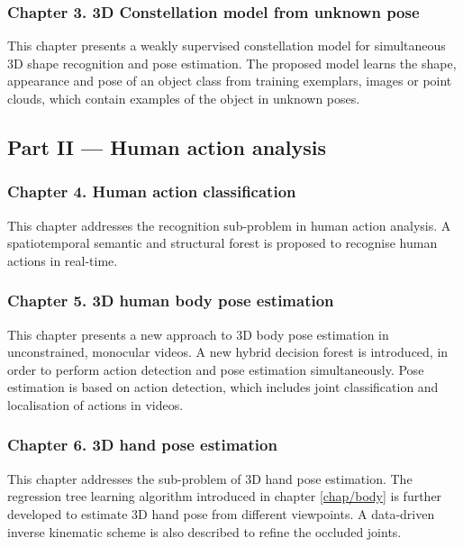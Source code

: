 \subsubsection*{Chapter 3. 3D Constellation model from unknown pose}
This chapter presents a weakly supervised constellation model for simultaneous 3D shape recognition and pose estimation. 
The proposed model learns the shape, appearance and pose of an object class from training exemplars, \eg images or point clouds, which contain examples of the object in unknown poses.  

\subsection*{Part II --- Human action analysis}


\subsubsection*{Chapter 4. Human action classification} 
This chapter addresses the recognition sub-problem in human action analysis. A spatiotemporal semantic and structural forest is proposed to recognise human actions in real-time.    

\subsubsection*{Chapter 5. 3D human body pose estimation} 
This chapter presents a new approach to 3D body pose estimation in unconstrained, monocular videos. 
A new hybrid decision forest is introduced, in order to perform action detection and pose estimation simultaneously. 
Pose estimation is based on action detection, which includes joint classification and localisation of actions in videos. 

\subsubsection*{Chapter 6. 3D hand pose estimation} 
This chapter addresses the sub-problem of 3D hand pose estimation. 
The regression tree learning algorithm introduced in chapter \ref{chap/body} is further developed to estimate 3D hand pose from different viewpoints. 
A data-driven inverse kinematic scheme is also described to refine the occluded joints.
